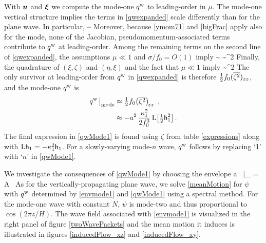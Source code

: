 \documentclass[12pt, oneside]{book}
\begin{document}
With $\boldsymbol u$ and $\boldsymbol {\xi}$ we compute the mode-one $q^{\mathrm{w}}$ to leading-order in $\mu$.  The mode-one vertical structure implies the terms in \eqref{qwexpanded} scale differently than for the plane wave.  In particular, 
\beq
{} \sim \mu \per
\eeq
Moreover, because  \eqref{ymom71} and \eqref{bigFrac} apply also for the mode, none of the Jacobian, pseudomomentum-associated terms contribute to $q^{\mathrm{w}}$ at leading-order.  Among the remaining terms on the second line of \eqref{qwexpanded}, the assumptions $\mu \ll 1$ and $\sigma / f_0 = O(1)$ imply
\beq
{} 
\sim \mu 
\qquad {} \qquad 
{} 
\sim \mu^2 \per
\eeq
Finally, the quadrature of $\left ( \xi,\zeta \right )$ and $\left ( \eta, \xi \right )$ and the fact that $\mu \ll 1$ imply 
\beq
{} \sim \mu^2 \per
\eeq
The only survivor at leading-order from $q^{\mathrm{w}}$ in \eqref{qwexpanded} is therefore $\tfrac{1}{2} f_0 (\overline{\zeta^2})_{zz} $, and the mode-one $q^{\mathrm{w}}$ is 
\begin{align}
q^{\mathrm{w}} \, \big |_{\mathrm{mode}} &\approx \tfrac{1}{2} f_0  \big ( \overline{\zeta^2} \big )_{\! zz} \, \, \, , \label{qwReduced} \\
&\approx - a^2 \, \frac{\kappa_1^2}{2 f_0^3} \, \mathrm{L} \big [ \tfrac{1}{2} \mathsf{h}_1^2 \big ] \, .
\label{qwMode1}
\end{align}
The final expression in \eqref{qwMode1} is found using $\zeta$ from table \ref{expressions} along with $\mathrm{L} \mathsf{h}_1 = - \kappa_1^2 \mathsf{h}_1$.  For a slowly-varying mode-$n$ wave, $q^{\mathrm{w}}$ follows by replacing `1' with `$n$' in \eqref{qwMode1}. 

We investigate the consequences of \eqref{qwMode1} by choosing the envelope
\beq
a \,  \big |_{} = A \, \exp {} \per
\label{envmode1}
\eeq
As for the vertically-propagating plane wave, we solve \eqref{meanMotion} for $\psi$ with $q^{\mathrm{w}}$ determined by   \eqref{envmode1} and \eqref{qwMode1} using a spectral method.  For the mode-one wave with constant $N$, $\psi$ is mode-two and thus proportional to $\cos(2 \pi z / H)$.  The wave field associated with \eqref{envmode1} is visualized in the right panel of figure \ref{twoWavePackets} and the mean motion it induces is illustrated in figures \ref{inducedFlow_xz} and \ref{inducedFlow_xy}.
\end{document}
